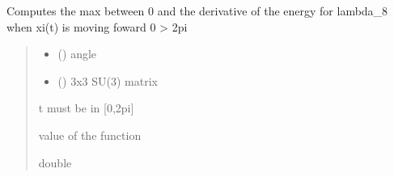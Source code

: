 \documentclass[letterpaper,10pt,english]{sphinxmanual}
\begin{document}
\begin{fulllineitems}
\label{\detokenize{numerical_reject:numerical_reject.derivee_f_lambda_8_plus_aller}}
\pysigstartsignatures
\pysiglinewithargsret
{}
{\sphinxparamcomma {}}
{}
\pysigstopsignatures
\sphinxAtStartPar
Computes the max between 0 and the derivative of the energy for lambda\_8 when xi(t) is moving foward 0 \sphinxhyphen{}\textgreater{} 2pi
\begin{quote}\begin{description}
\begin{itemize}
\item {} 
\sphinxAtStartPar
{} () \textendash{} angle

\item {} 
\sphinxAtStartPar
{} () \textendash{} 3x3 SU(3) matrix

\end{itemize}

\sphinxAtStartPar
{} \textendash{} t must be in {[}0,2pi{]}

\sphinxAtStartPar
value of the function

\sphinxAtStartPar
double

\end{description}\end{quote}

\end{fulllineitems}

\end{document}
